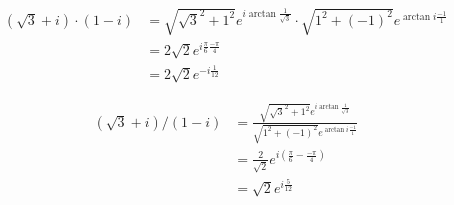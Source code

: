 \documentclass[11pt, a4paper, norsk]{NTNUoving}
\begin{document}



\ifx
\begin{oppgave}
    \begin{punkt}
        \begin{align*}
        
        
        \end{align*}
    \end{punkt}
\end{oppgave}


\fi

\begin{oppgave}
    \begin{punkt}
        \begin{align*}
            (\sqrt{3} + i)\cdot (1-i) &= 
            \sqrt{\sqrt{3}^2 + 1^2} e^{i\arctan{\frac{1}{\sqrt{3}}}}\cdot \sqrt{1^2+(-1)^2} e^{\arctan{i\frac{-1}{1}}}
            \\&= 2\sqrt{2} e^{i\frac{\pi}{6}\frac{-\pi}{4}}
            \\&= 2\sqrt{2} e^{-i\frac{1}{12}}
        \end{align*}
    \end{punkt}
    
    \begin{punkt}
        \begin{align*}
            (\sqrt{3} + i)/ (1-i) &= 
            \frac{\sqrt{\sqrt{3}^2 + 1^2} e^{i\arctan{\frac{1}{\sqrt{3}}}}}{ \sqrt{1^2+(-1)^2} e^{\arctan{i\frac{-1}{1}}}}
            \\&= \frac{2}{\sqrt{2}} e^{i (\frac{\pi}{6}-\frac{-\pi}{4})}
            \\&=\sqrt{2}e^{i\frac{5}{12}}
        \end{align*}
    \end{punkt}
\end{oppgave}
\end{document}
